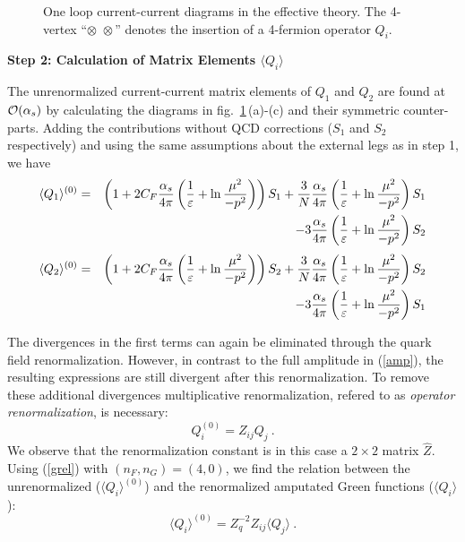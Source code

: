 \documentclass[12pt,rotate]{article}
\def\eps{\varepsilon}
\def\as{\alpha_s}
\newcommand{\ord}{{\cal O}}
\def\aspi{\frac{\as}{4\pi}}
\begin{document}
\begin{itemize}
\begin{itemize}
\begin{itemize}
\begin{figure}[hbt]
\vspace{0.10in}
\centerline{
\epsfysize=1.25in
}%
\vspace{0.08in}
\caption[]{One loop current-current  diagrams
in
the effective theory. The 4-vertex ``$\otimes\,\,\otimes$'' denotes the
insertion of a 4-fermion operator $Q_i$.
\label{L:15}}
\end{figure}

{\bf Step 2: Calculation of Matrix Elements $\langle Q_i\rangle$}

The unrenormalized current-current matrix elements
of $Q_1$ and $Q_2$ are found at $\ord(\as)$ by calculating 
the diagrams in  fig.~\ref{L:15}\,(a)-(c) and their symmetric counter-parts.
Adding the contributions without QCD corrections 
($S_1$ and $S_2$ respectively) and using
the same assumptions about the external legs as in step 1, 
we have
\begin{eqnarray}\label{q10}
\langle Q_1\rangle^{(0)} &= & 
\left(1+2C_F \aspi\left({1\over\eps}+\ln{\mu^2\over -p^2}
\right)\right)S_1+{3\over N}\aspi\left({1\over\eps}+\ln{\mu^2\over -p^2}
\right)S_1
\nonumber\\
& &-3\aspi\left({1\over\eps}+\ln{\mu^2\over -p^2}\right) S_2  
\end{eqnarray}
\begin{eqnarray}\label{q20}
\langle Q_2\rangle^{(0)} &=& 
\left(1+2C_F \aspi\left({1\over\eps}+\ln{\mu^2\over -p^2}
\right)\right)S_2+{3\over N}\aspi\left({1\over\eps}+\ln{\mu^2\over -p^2}
\right)S_2
\nonumber\\
& & -3\aspi\left({1\over\eps}+\ln{\mu^2\over -p^2}\right) S_1  
\end{eqnarray}

The divergences in the first terms can again be  eliminated through 
the quark field
renormalization. However, in contrast to the full amplitude
in (\ref{amp}), the
resulting expressions are still divergent after this renormalization.
To remove these additional divergences
multiplicative renormalization, refered to as {\it operator renormalization},
is necessary:
\begin{equation}
Q_i^{(0)} = Z_{ij} Q_j~.
\label{AL}
\end{equation}
We observe that the renormalization constant is in this case a $2\times 2$
matrix $\hat Z$.
Using (\ref{grel})  with $(n_F,n_G)=(4,0)$, we find 
the relation between the unrenormalized
($\langle Q_i\rangle^{(0)}$) and the renormalized amputated Green
functions ($\langle Q_i\rangle$):
\begin{equation}\label{q0zq}
\langle Q_i\rangle^{(0)}=Z^{-2}_q Z_{ij}\langle Q_j\rangle~.
\end{equation}


\end{itemize}
\end{itemize}
\end{itemize}
\end{document}
